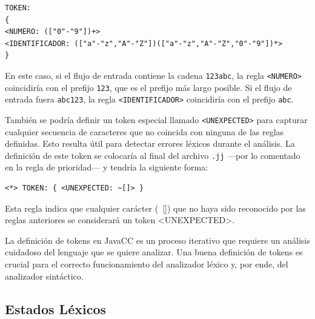 \lstset{inputencoding=utf8/latin1}
\begin{lstlisting}
TOKEN:
{
<NUMERO: (["0"-"9"])+>
<IDENTIFICADOR: (["a"-"z","A"-"Z"])(["a"-"z","A"-"Z","0"-"9"])*>
}
\end{lstlisting}

En este caso, si el flujo de entrada contiene la cadena \lstinline|123abc|, la regla \lstinline|<NUMERO>| coincidiría con el prefijo \lstinline|123|, que es el prefijo más largo posible. Si el flujo de entrada fuera \lstinline|abc123|, la regla \lstinline|<IDENTIFICADOR>| coincidiría con el prefijo \lstinline|abc|.

También se podría definir un token especial llamado \lstinline|<UNEXPECTED>| para capturar cualquier secuencia de caracteres que no coincida con ninguna de las reglas definidas. Esto resulta útil para detectar errores léxicos durante el análisis. La definición de este token se colocaría al final del archivo \lstinline|.jj| ---por lo comentado en la regla de prioridad--- y tendría la siguiente forma:

\lstset{inputencoding=utf8/latin1}
\begin{lstlisting}
<*> TOKEN: { <UNEXPECTED: ~[]> }
\end{lstlisting}

Esta regla indica que cualquier carácter (~[]) que no haya sido reconocido por las reglas anteriores se considerará un token <UNEXPECTED>.

La definición de tokens en JavaCC es un proceso iterativo que requiere un análisis cuidadoso del lenguaje que se quiere analizar. Una buena definición de tokens es crucial para el correcto funcionamiento del analizador léxico y, por ende, del analizador sintáctico.

\subsection{Estados Léxicos}


